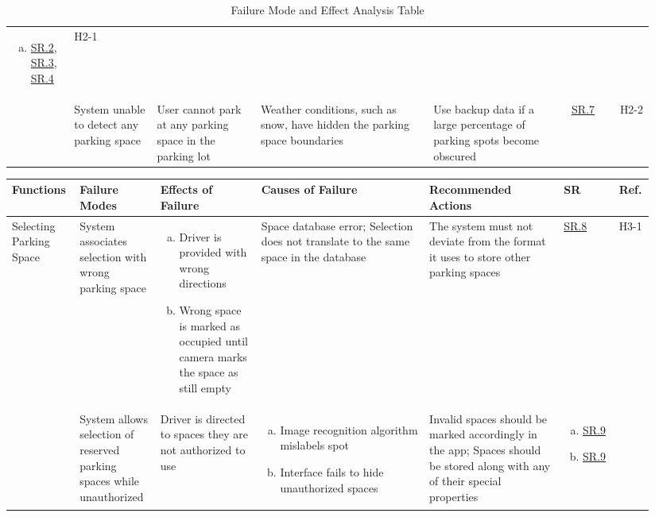 \documentclass[12pt,letterpaper]{article}
\begin{document}
\begin{landscape}
\begin{table}[hp]
\begin{tabular}{|p{0.09\linewidth}|p{0.12\linewidth}|p{0.15\linewidth}|p{0.25\linewidth}|p{0.2\linewidth}|p{0.075\linewidth}|p{0.05\linewidth}|}
\begin{enumerate}[a., leftmargin=0.5cm,
noitemsep, nolistsep]
\hyperref[isr4]{SR.4} \item \hyperref[asr2]{SR.2}, \hyperref[asr3]{SR.3},
\hyperref[isr4]{SR.4}\end{enumerate}& H2-1\\\cline{2-7} & System unable to
detect any parking space & User cannot park at any parking space in the parking
lot & Weather conditions, such as snow, have hidden the parking space boundaries
& Use backup data if a large percentage of parking spots become obscured &
\hyperref[isr7]{SR.7} & H2-2\\
\hline
\end{tabular}
\caption{Failure Mode and Effect Analysis Table} \label{TblFMEA}
\end{table}

\begin{table}[hp]
\begin{tabular}{|p{0.09\linewidth}|p{0.12\linewidth}|p{0.15\linewidth}|p{0.25\linewidth}|p{0.2\linewidth}|p{0.075\linewidth}|p{0.05\linewidth}|}
\hline
Functions & Failure Modes & Effects of Failure & Causes of Failure & Recommended
Actions & SR & Ref.\\
\hline
Selecting Parking Space & System associates selection with wrong parking space &
\begin{enumerate}[a., leftmargin=0.5cm, noitemsep, nolistsep] \item Driver is
provided with wrong directions \item Wrong space is marked as occupied until
camera marks the space as still empty \end{enumerate} & Space database error;
Selection does not translate to the same space in the database & The system must
not deviate from the format it uses to store other parking spaces &
\hyperref[isr8]{SR.8} & H3-1\\\cline{2-7} & System allows selection of reserved
parking spaces while unauthorized & Driver is directed to spaces they are not
authorized to use & \begin{enumerate}[a., leftmargin=0.5cm, noitemsep,
nolistsep] \item Image recognition algorithm mislabels spot \item Interface
fails to hide unauthorized spaces \end{enumerate} & Invalid spaces should be
marked accordingly in the app; Spaces should be stored along with any of their
special properties & \begin{enumerate}[a., leftmargin=0.5cm, noitemsep,
nolistsep]\item \hyperref[isr9]{SR.9} \item \hyperref[isr9]{SR.9}

\end{enumerate}
\end{tabular}
\end{table}
\end{landscape}
\end{document}
